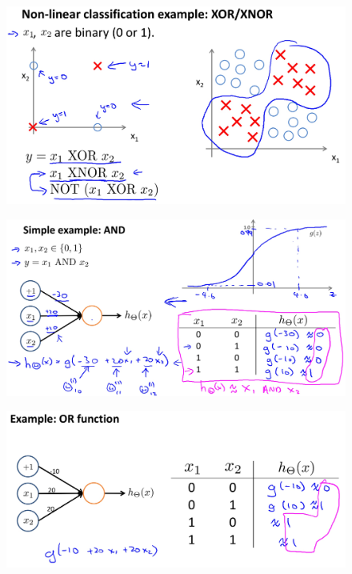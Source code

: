 \documentclass[12pt, A4,onecolumn]{article} %
\begin{document}
\begin{figure}[H]
	\centering
	\includegraphics[width=1\textwidth]{./ImagenesW4/xor}
\end{figure}

\begin{figure}[H]
	\centering
	\includegraphics[width=1\textwidth]{./ImagenesW4/and}
\end{figure}

\begin{figure}[H]
	\centering
	\includegraphics[width=1\textwidth]{./ImagenesW4/or}
\end{figure}
\end{document}
